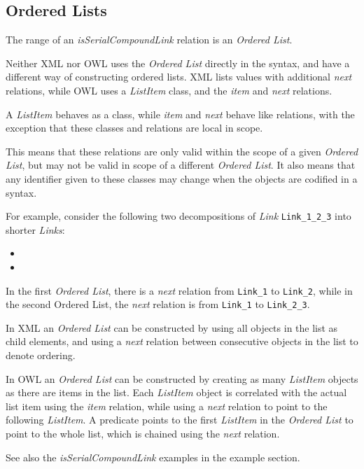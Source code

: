 

\subsection{Ordered Lists} %
\label{sub:ordered_lists}

The range of an \emph{isSerialCompoundLink} relation is an \emph{Ordered List}.

Neither XML nor OWL uses the \emph{Ordered List} directly in the syntax, and have a different way of constructing ordered lists. XML lists values with additional \emph{next} relations, while OWL uses a \emph{ListItem} class, and the \emph{item} and \emph{next} relations.

A \emph{ListItem} behaves as a class, while \emph{item} and \emph{next} behave like relations, with the exception that these classes and relations are local in scope.

This means that these relations are only valid within the scope of a given \emph{Ordered List}, but may not be valid in scope of a different \emph{Ordered List}. It also means that any identifier given to these classes may change when the objects are codified in a syntax.

For example, consider the following two decompositions of \emph{Link} \texttt{Link\_1\_2\_3} into shorter \emph{Links}:

\begin{itemize}
    \item {}
    \item {}
\end{itemize}

In the first \emph{Ordered List}, there is a \emph{next} relation from \texttt{Link\_1} to \texttt{Link\_2}, while in the second Ordered List, the \emph{next} relation is from \texttt{Link\_1} to \texttt{Link\_2\_3}.

In XML an \emph{Ordered List} can be constructed by using all objects in the list as child elements, and using a \emph{next} relation between consecutive objects in the list to denote ordering.

In OWL an \emph{Ordered List} can be constructed by creating as many \emph{ListItem} objects as there are items in the list. Each \emph{ListItem} object is correlated with the actual list item using the \emph{item} relation, while using a \emph{next} relation to point to the following \emph{ListItem}.
A predicate points to the first \emph{ListItem} in the \emph{Ordered List} to point to the whole list, which is chained using the \emph{next} relation.

See also the \emph{isSerialCompoundLink} examples in the example section.
